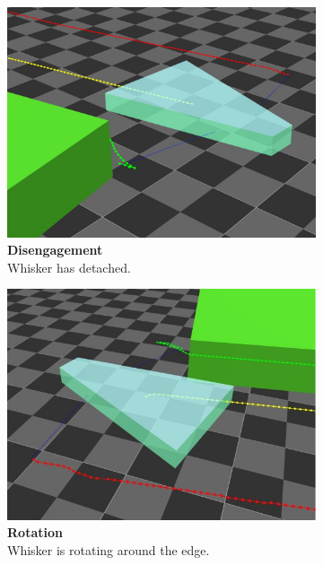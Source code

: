 \begin{figure}[H]
\begin{subfigure}[b]{0.48\textwidth}
        \includegraphics[width=\textwidth]{figures/retrieval/disengagement}
        \caption{\textbf{Disengagement}\\Whisker has detached.}
        \label{fig:retrieval-0-2}
    \end{subfigure}
    \begin{subfigure}[b]{0.48\textwidth}
        \centering
        \captionsetup{justification=centering}
        \includegraphics[width=\textwidth]{figures/retrieval/mid-retrieval}
        \caption{\textbf{Rotation}\\Whisker is rotating around the edge.}
        \label{fig:retrieval-1-1}
    \end{subfigure}\hfill
    \begin{subfigure}[b]{0.48\textwidth}

\end{subfigure}
\end{figure}
